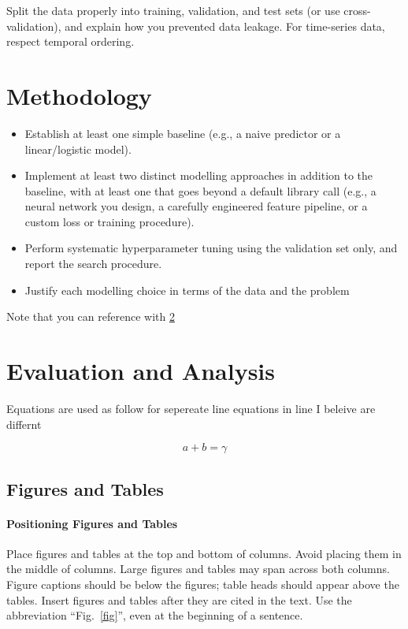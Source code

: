 \documentclass[conference]{IEEEtran}
\begin{document}
Split the data properly into training, validation, and test sets (or use cross-validation), and explain
how you prevented data leakage. For time-series data, respect temporal ordering.


\section{Methodology}
\begin{itemize}
  \item Establish at least one simple baseline (e.g., a naive predictor or a linear/logistic model).
  \item Implement at least two distinct modelling approaches in addition to the baseline, with at least
        one that goes beyond a default library call (e.g., a neural network you design, a carefully
        engineered feature pipeline, or a custom loss or training procedure).
  \item Perform systematic hyperparameter tuning using the validation set only, and report the search
        procedure.
  \item Justify each modelling choice in terms of the data and the problem
\end{itemize}

Note that you can reference with \ref{EA}

\section{Evaluation and Analysis}\label{EA}
Equations are used as follow for sepereate line equations in line I beleive are differnt

\begin{equation}
a+b=\gamma\label{eq}
\end{equation}

\subsection{Figures and Tables}
\paragraph{Positioning Figures and Tables} Place figures and tables at the top and 
bottom of columns. Avoid placing them in the middle of columns. Large 
figures and tables may span across both columns. Figure captions should be 
below the figures; table heads should appear above the tables. Insert 
figures and tables after they are cited in the text. Use the abbreviation 
``Fig.~\ref{fig}'', even at the beginning of a sentence.
\end{document}
